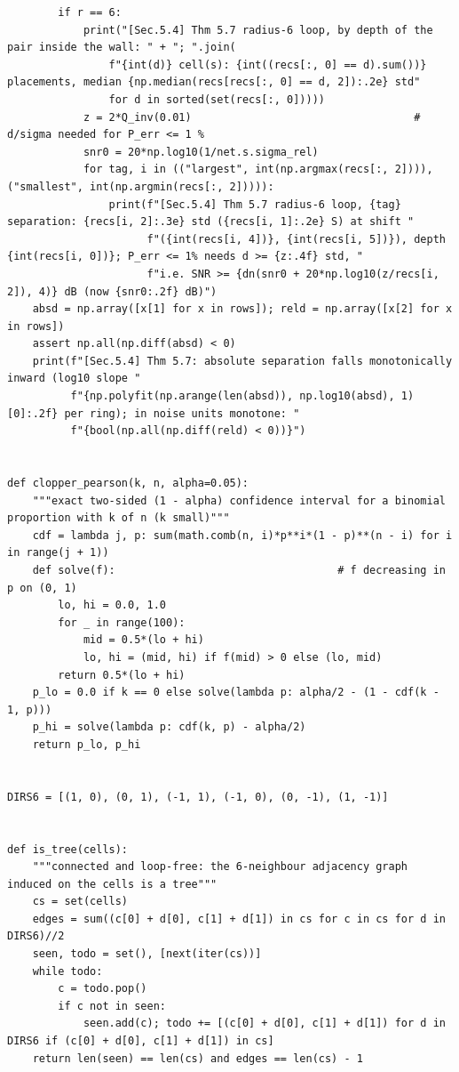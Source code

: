 \documentclass[11pt,a4paper]{article}
\theoremstyle{definition}
\theoremstyle{remark}
\begin{document}
\begin{lstlisting}
        if r == 6:
            print("[Sec.5.4] Thm 5.7 radius-6 loop, by depth of the pair inside the wall: " + "; ".join(
                f"{int(d)} cell(s): {int((recs[:, 0] == d).sum())} placements, median {np.median(recs[recs[:, 0] == d, 2]):.2e} std"
                for d in sorted(set(recs[:, 0]))))
            z = 2*Q_inv(0.01)                                   # d/sigma needed for P_err <= 1 %
            snr0 = 20*np.log10(1/net.s.sigma_rel)
            for tag, i in (("largest", int(np.argmax(recs[:, 2]))), ("smallest", int(np.argmin(recs[:, 2])))):
                print(f"[Sec.5.4] Thm 5.7 radius-6 loop, {tag} separation: {recs[i, 2]:.3e} std ({recs[i, 1]:.2e} S) at shift "
                      f"({int(recs[i, 4])}, {int(recs[i, 5])}), depth {int(recs[i, 0])}; P_err <= 1% needs d >= {z:.4f} std, "
                      f"i.e. SNR >= {dn(snr0 + 20*np.log10(z/recs[i, 2]), 4)} dB (now {snr0:.2f} dB)")
    absd = np.array([x[1] for x in rows]); reld = np.array([x[2] for x in rows])
    assert np.all(np.diff(absd) < 0)
    print(f"[Sec.5.4] Thm 5.7: absolute separation falls monotonically inward (log10 slope "
          f"{np.polyfit(np.arange(len(absd)), np.log10(absd), 1)[0]:.2f} per ring); in noise units monotone: "
          f"{bool(np.all(np.diff(reld) < 0))}")


def clopper_pearson(k, n, alpha=0.05):
    """exact two-sided (1 - alpha) confidence interval for a binomial proportion with k of n (k small)"""
    cdf = lambda j, p: sum(math.comb(n, i)*p**i*(1 - p)**(n - i) for i in range(j + 1))
    def solve(f):                                   # f decreasing in p on (0, 1)
        lo, hi = 0.0, 1.0
        for _ in range(100):
            mid = 0.5*(lo + hi)
            lo, hi = (mid, hi) if f(mid) > 0 else (lo, mid)
        return 0.5*(lo + hi)
    p_lo = 0.0 if k == 0 else solve(lambda p: alpha/2 - (1 - cdf(k - 1, p)))
    p_hi = solve(lambda p: cdf(k, p) - alpha/2)
    return p_lo, p_hi


DIRS6 = [(1, 0), (0, 1), (-1, 1), (-1, 0), (0, -1), (1, -1)]


def is_tree(cells):
    """connected and loop-free: the 6-neighbour adjacency graph induced on the cells is a tree"""
    cs = set(cells)
    edges = sum((c[0] + d[0], c[1] + d[1]) in cs for c in cs for d in DIRS6)//2
    seen, todo = set(), [next(iter(cs))]
    while todo:
        c = todo.pop()
        if c not in seen:
            seen.add(c); todo += [(c[0] + d[0], c[1] + d[1]) for d in DIRS6 if (c[0] + d[0], c[1] + d[1]) in cs]
    return len(seen) == len(cs) and edges == len(cs) - 1



\end{lstlisting}
\end{document}
